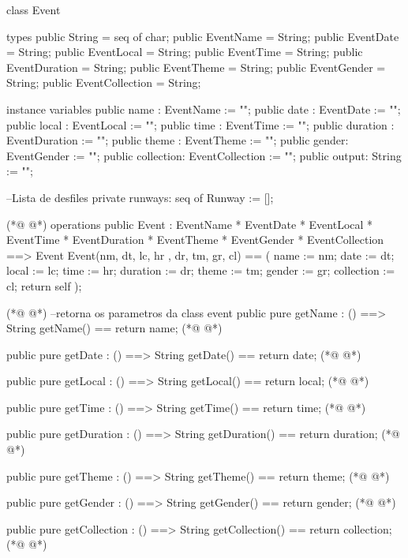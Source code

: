 \begin{vdmpp}[breaklines=true]
class Event
 
types
 public String = seq of char; 
 public EventName = String;
 public EventDate = String;
 public EventLocal = String;
 public EventTime = String;
 public EventDuration = String;
 public EventTheme = String;
 public EventGender = String;
  public EventCollection = String;

instance variables
 public  name : EventName := "";
 public  date : EventDate := "";
 public  local : EventLocal := "";
 public  time : EventTime := "";
 public  duration : EventDuration := "";
 public  theme : EventTheme := "";
 public  gender: EventGender := "";
 public  collection: EventCollection := "";
 public  output: String := "";
 
 --Lista de desfiles
 private runways: seq of Runway := [];
 
(*@
\label{Event:28}
@*)
operations
 public Event : 
         EventName * 
         EventDate *
         EventLocal *
         EventTime *
         EventDuration *
         EventTheme *
         EventGender *  
         EventCollection ==> Event
 Event(nm, dt, lc, hr , dr, tm, gr, cl) == (
  name := nm;
  date := dt;
  local := lc;
  time := hr;
  duration := dr;
  theme := tm;
  gender := gr;
  collection := cl;
  return self
 );
 
(*@
\label{getName:50}
@*)
 --retorna os parametros da class event
  public pure getName : () ==> String
    getName() == return name;
(*@
\label{getDate:53}
@*)
    
   public pure getDate : () ==> String
     getDate() == return date;
(*@
\label{getLocal:56}
@*)
     
  public pure getLocal : () ==> String
     getLocal() == return local;
(*@
\label{getTime:59}
@*)
     
  public pure getTime : () ==> String
     getTime() == return time;      
(*@
\label{getDuration:62}
@*)
     
  public pure getDuration : () ==> String
     getDuration() == return duration;
(*@
\label{getTheme:65}
@*)
     
  public pure getTheme : () ==> String
     getTheme() == return theme;
(*@
\label{getGender:68}
@*)
     
  public pure getGender : () ==> String
     getGender() == return gender;
(*@
\label{getCollection:71}
@*)
     
  public pure getCollection : () ==> String
     getCollection() == return collection;
(*@
\label{getRunways:74}
@*)
  

\end{vdmpp}
